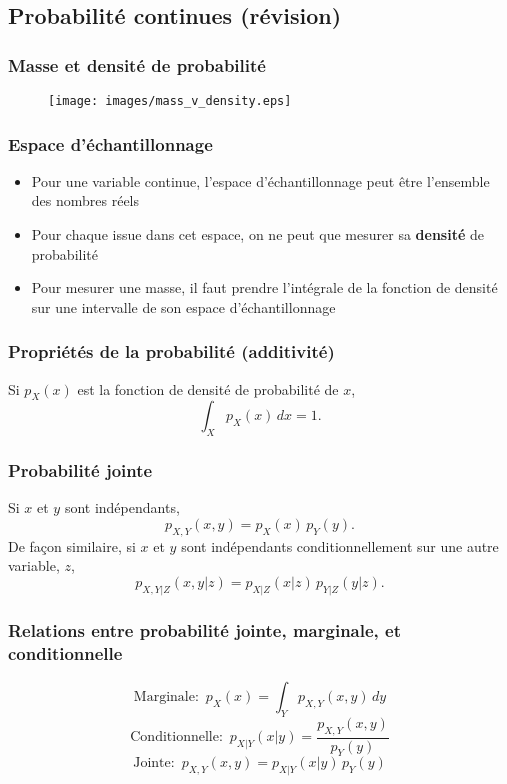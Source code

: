 \documentclass{beamer}
\begin{document}

\subsection{Probabilité continues (révision)}

\begin{frame}
    \frametitle{Masse et densité de probabilité}
    \begin{figure}
      \centering
      \texttt{[image: images/mass\_v\_density.eps]}
    \end{figure}
\end{frame}


\begin{frame}
    \frametitle{Espace d'échantillonnage}
    \begin{itemize}
      \item Pour une variable continue, l'espace d'échantillonnage peut être l'ensemble des nombres réels
      \pause
      \item Pour chaque issue dans cet espace, on ne peut que mesurer sa \textbf{densité} de probabilité
      \pause
      \item Pour mesurer une masse, il faut prendre l'intégrale de la fonction
            de densité sur une intervalle de son espace d'échantillonnage
    \end{itemize}
\end{frame}


\begin{frame}
    \frametitle{Propriétés de la probabilité (additivité)}
    Si $p_X(x)$ est la fonction de densité de probabilité de $x$,
    \[\int_X p_X(x) \, dx = 1.\]
\end{frame}


\begin{frame}
    \frametitle{Probabilité jointe}
    Si $x$ et $y$ sont indépendants,
    \[p_{X,Y}(x,y) = p_X(x) \, p_Y(y).\]
    \pause
    De façon similaire, si $x$ et $y$ sont indépendants
    conditionnellement sur une autre variable, $z$,
    \[p_{X,Y|Z}(x,y|z) = p_{X|Z}(x|z) \, p_{Y|Z}(y|z).\]
\end{frame}


\begin{frame}
    \frametitle{Relations entre probabilité jointe, marginale, et conditionnelle}
    \[\textrm{Marginale:} \, \, \, p_X(x) = \int_Y p_{X,Y}(x,y) \, dy\]
    \pause
    \[\textrm{Conditionnelle:} \, \, \, p_{X|Y}(x|y) = \frac{p_{X,Y}(x,y)}{p_Y(y)}\]
    \pause
    \[\textrm{Jointe:} \, \, \, p_{X,Y}(x,y) = p_{X|Y}(x|y) \, p_Y(y)\]
\end{frame}
\end{document}
